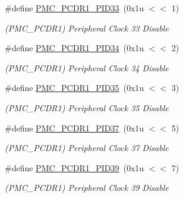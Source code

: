 \begin{DoxyCompactItemize}
\mbox{\label{group__SAME70__PMC_ga2f67bfc10261d8258d34bab378a218c9}} 
\#define \mbox{\hyperlink{group__SAME70__PMC_ga2f67bfc10261d8258d34bab378a218c9}{P\+M\+C\+\_\+\+P\+C\+D\+R1\+\_\+\+P\+I\+D33}}~(0x1u $<$$<$ 1)
\begin{DoxyCompactList}\small\item\em (P\+M\+C\+\_\+\+P\+C\+D\+R1) Peripheral Clock 33 Disable \end{DoxyCompactList}\item 
\mbox{\label{group__SAME70__PMC_gafc8c916c52c1485f8425208b606399fc}} 
\#define \mbox{\hyperlink{group__SAME70__PMC_gafc8c916c52c1485f8425208b606399fc}{P\+M\+C\+\_\+\+P\+C\+D\+R1\+\_\+\+P\+I\+D34}}~(0x1u $<$$<$ 2)
\begin{DoxyCompactList}\small\item\em (P\+M\+C\+\_\+\+P\+C\+D\+R1) Peripheral Clock 34 Disable \end{DoxyCompactList}\item 
\mbox{\label{group__SAME70__PMC_gab1fd1c1d986befa79913baf342cd3e72}} 
\#define \mbox{\hyperlink{group__SAME70__PMC_gab1fd1c1d986befa79913baf342cd3e72}{P\+M\+C\+\_\+\+P\+C\+D\+R1\+\_\+\+P\+I\+D35}}~(0x1u $<$$<$ 3)
\begin{DoxyCompactList}\small\item\em (P\+M\+C\+\_\+\+P\+C\+D\+R1) Peripheral Clock 35 Disable \end{DoxyCompactList}\item 
\mbox{\label{group__SAME70__PMC_ga710106c0e561196af743f9c85af4b78e}} 
\#define \mbox{\hyperlink{group__SAME70__PMC_ga710106c0e561196af743f9c85af4b78e}{P\+M\+C\+\_\+\+P\+C\+D\+R1\+\_\+\+P\+I\+D37}}~(0x1u $<$$<$ 5)
\begin{DoxyCompactList}\small\item\em (P\+M\+C\+\_\+\+P\+C\+D\+R1) Peripheral Clock 37 Disable \end{DoxyCompactList}\item 
\mbox{\label{group__SAME70__PMC_gaa857e9321c2268a3cef83b1bb0db20d7}} 
\#define \mbox{\hyperlink{group__SAME70__PMC_gaa857e9321c2268a3cef83b1bb0db20d7}{P\+M\+C\+\_\+\+P\+C\+D\+R1\+\_\+\+P\+I\+D39}}~(0x1u $<$$<$ 7)
\begin{DoxyCompactList}\small\item\em (P\+M\+C\+\_\+\+P\+C\+D\+R1) Peripheral Clock 39 Disable \end{DoxyCompactList}\item 
$$
\end{DoxyCompactItemize}
